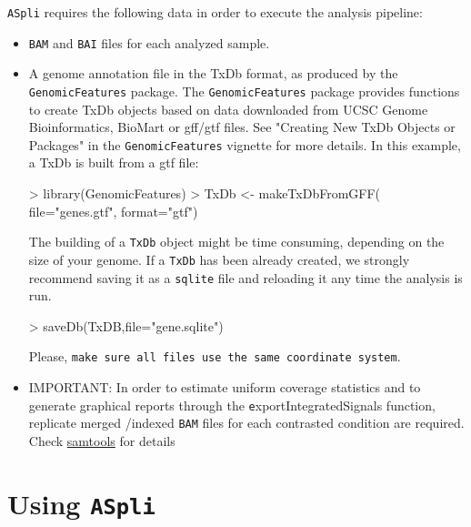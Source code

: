 \documentclass{article}
\begin{document}
\texttt{ASpli} requires the following data in order to execute the analysis pipeline:
\begin{itemize}
\item \texttt{BAM} and \texttt{BAI} files for each analyzed sample.
\item A genome annotation file in the TxDb format, as produced by the \texttt{GenomicFeatures} package.
The \texttt{GenomicFeatures} package provides functions to create TxDb objects based on data downloaded from
UCSC Genome Bioinformatics, BioMart or gff/gtf files. 
See "Creating New TxDb Objects or Packages" in the \texttt{GenomicFeatures} vignette for more details. In this example, a TxDb is built from a gtf file:

\begin{Schunk}
\begin{Sinput}
> library(GenomicFeatures)
> TxDb <- makeTxDbFromGFF(
   file="genes.gtf",
   format="gtf")
\end{Sinput}
\end{Schunk}


The building of a \texttt{TxDb} object might be time consuming, depending on the size of your genome. If a \texttt{TxDb} has been already created, we strongly recommend saving it as a \texttt{sqlite} file and reloading it any time the analysis is run. 

\begin{Schunk}
\begin{Sinput}
>  saveDb(TxDB,file="gene.sqlite")
\end{Sinput}
\end{Schunk}

Please, \texttt{make sure all files use the same coordinate system}.
\item IMPORTANT: In order to estimate uniform coverage statistics and to generate graphical reports through the {\texttt exportIntegratedSignals} function, replicate merged /indexed \texttt{BAM} files for each contrasted condition are required.
Check  \href{http://www.htslib.org/doc/samtools-merge.html} {samtools} for details

\end{itemize}

\section{Using \texttt{ASpli}}
\end{document}
